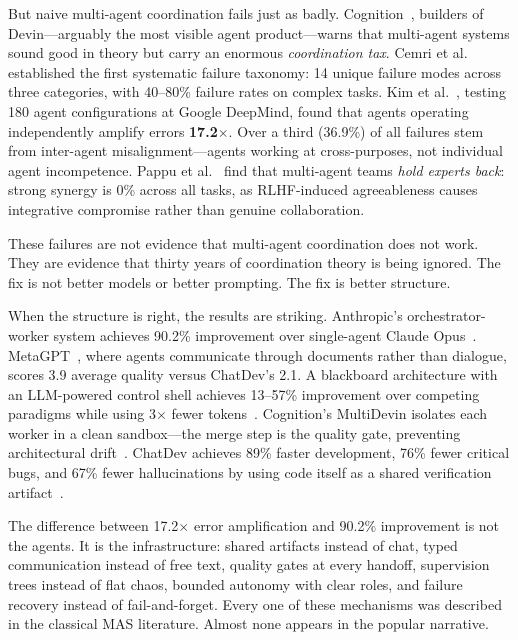 \documentclass{article}
\begin{document}
But naive multi-agent coordination fails just as badly.
Cognition~\citep{cognition2025dontbuild}, builders of Devin---arguably the most visible
agent product---warns that multi-agent systems sound good in theory but carry an enormous
\emph{coordination tax}.  Cemri et al.~\citep{cemri2025fail} established the first
systematic failure taxonomy: 14 unique failure modes across three categories, with
40--80\% failure rates on complex tasks.  Kim et al.~\citep{kim2025scaling}, testing 180
agent configurations at Google DeepMind, found that agents operating independently
amplify errors \textbf{17.2$\times$}.  Over a third (36.9\%) of all failures stem from
inter-agent misalignment---agents working at cross-purposes, not individual agent
incompetence.  Pappu et al.~\citep{pappu2026multiagent} find that multi-agent teams
\emph{hold experts back}: strong synergy is 0\% across all tasks, as RLHF-induced
agreeableness causes integrative compromise rather than genuine collaboration.

These failures are not evidence that multi-agent coordination does not work.  They are
evidence that thirty years of coordination theory is being ignored.  The fix is not better
models or better prompting.  The fix is better structure.

When the structure is right, the results are striking.  Anthropic's orchestrator-worker
system achieves 90.2\% improvement over single-agent Claude
Opus~\citep{anthropic2025building}.  MetaGPT~\citep{hong2024metagpt}, where agents
communicate through documents rather than dialogue, scores 3.9 average quality versus
ChatDev's 2.1.  A blackboard architecture with an LLM-powered control shell achieves
13--57\% improvement over competing paradigms while using 3$\times$ fewer
tokens~\citep{lbmas2025}.  Cognition's MultiDevin isolates each worker in a clean
sandbox---the merge step is the quality gate, preventing architectural
drift~\citep{cognition2025devin}.  ChatDev achieves 89\% faster development, 76\% fewer
critical bugs, and 67\% fewer hallucinations by using code itself as a shared
verification artifact~\citep{qian2024chatdev}.

The difference between 17.2$\times$ error amplification and 90.2\% improvement is not the
agents.  It is the infrastructure: shared artifacts instead of chat, typed communication
instead of free text, quality gates at every handoff, supervision trees instead of flat
chaos, bounded autonomy with clear roles, and failure recovery instead of fail-and-forget.
Every one of these mechanisms was described in the classical MAS literature.  Almost none
appears in the popular narrative.
\end{document}
